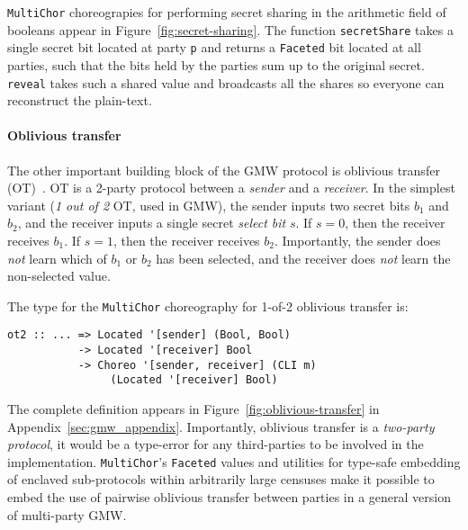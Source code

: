 \documentclass[sigplan,screen,review,anonymous]{acmart}
\newcommand{\inlinecode}[2][haskell]{\texttt{#2}}
\newcommand{\MultiChor}{\texttt{Multi\-Chor}\xspace}
\begin{document}
\MultiChor choreograpies for performing secret sharing in the arithmetic field of booleans appear in Figure~\ref{fig:secret-sharing}. The function \inlinecode{secretShare} takes a single secret bit located at party \inlinecode{p} and returns a \inlinecode{Faceted} bit located at all parties, such that the bits held by the parties sum up to the original secret.
\inlinecode{reveal} takes such a shared value and broadcasts
all the shares so everyone can reconstruct the plain-text.

\paragraph{Oblivious transfer}
The other important building block of the GMW protocol is oblivious transfer (OT)~\cite{naor2001efficient}. OT is a 2-party protocol between a \emph{sender} and a \emph{receiver}. In the simplest variant (\emph{1 out of 2} OT, used in GMW), the sender inputs two secret bits $b_1$ and $b_2$, and the receiver inputs a single secret \emph{select bit} $s$. If $s=0$, then the receiver receives $b_1$. If $s=1$, then the receiver receives $b_2$. Importantly, the sender does \emph{not} learn which of $b_1$ or $b_2$ has been selected, and the receiver does \emph{not} learn the non-selected value.

The type for the  \MultiChor choreography for 1-of-2 oblivious transfer is:
%
\begin{verbatim}
ot2 :: ... => Located '[sender] (Bool, Bool)
           -> Located '[receiver] Bool
           -> Choreo '[sender, receiver] (CLI m) 
                (Located '[receiver] Bool)
\end{verbatim}
%
The complete definition appears in Figure~\ref{fig:oblivious-transfer} in Appendix~\ref{sec:gmw_appendix}. Importantly, oblivious transfer is a \emph{two-party protocol}, it would be a type-error for any third-parties to be involved in the implementation. \MultiChor's \inlinecode{Faceted} values and utilities for type-safe embedding of enclaved sub-protocols within arbitrarily large censuses make it possible to embed the use of pairwise oblivious transfer between parties in a general version of multi-party GMW.
\end{document}
